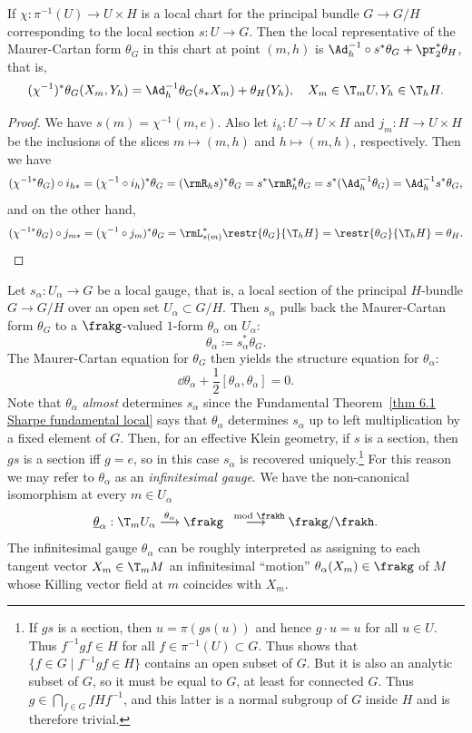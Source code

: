 \begin{prop}\label{prop 4.7.1 Sharpe}
    If $\chi:\pi^{-1}(U)\to U\times H$ is a local chart for the principal bundle $G\to G\slash H$ corresponding to the local section $ s:U\to G$. Then the local representative of the Maurer-Cartan form $\theta_G$ in this chart at point $(m,h)$ is $\Ad_h^{-1}\circ  s^\ast\theta_G +\pr_2^\ast\theta_H$, that is,
    \[(\chi^{-1})^\ast\theta_G(X_m,Y_h)=\Ad_h^{-1}\theta_G( s_\ast X_m)+\theta_H(Y_h),\quad X_m\in \T_mU,Y_h\in \T_h H.\]
\end{prop}
\begin{proof}
    We have $ s(m)=\chi^{-1}(m,e)$. Also let $i_h:U\to U\times H$ and $j_m:H\to U\times H$ be the inclusions of the slices $m\mapsto (m,h)$ and $h\mapsto (m,h)$, respectively. Then we have
    \[(\chi^{-1\ast}\theta_G)\circ i_{h\ast}=(\chi^{-1}\circ i_h)^\ast \theta_G=(\rmR_h s)^\ast \theta_G= s^\ast \rmR_h^\ast \theta_G= s^\ast(\Ad_h^{-1}\theta_G)=\Ad_h^{-1} s^\ast \theta_G,\]
    and on the other hand, 
    \[(\chi^{-1\ast}\theta_G)\circ j_{m\ast}=(\chi^{-1}\circ j_m)^\ast \theta_G=\rmL_{ s(m)}^\ast\restr{\theta_G}{\T_hH}=\restr{\theta_G}{\T_hH}=\theta_H.\]
\end{proof}

Let $ s_\alpha:U_\alpha\to G$ be a local gauge, that is, a local section of the principal $H$-bundle $G\to G\slash H$ over an open set $U_\alpha\subset G\slash H$. Then $ s_\alpha$ pulls back the Maurer-Cartan form $\theta_G$ to a $\frakg$-valued $1$-form $\theta_\alpha$ on $U_\alpha$: \[\theta_\alpha\coloneqq  s_\alpha^\ast\theta_G.\] 
The Maurer-Cartan equation for $\theta_G$ then yields the structure equation for $\theta_\alpha$:
\[\dd\theta_\alpha+\frac 12[\theta_\alpha,\theta_\alpha]=0.\]
Note that $\theta_\alpha$ \emph{almost} determines $ s_\alpha$ since the Fundamental Theorem~\ref{thm 6.1 Sharpe fundamental local} says that $\theta_\alpha$ determines $ s_\alpha$ up to left multiplication by a fixed element of $G$. Then, for an effective Klein geometry, if $ s$ is a section, then $g s$ is a section iff $g=e$, so in this case $ s_\alpha$ is recovered uniquely.\footnote{If $g s$ is a section, then $u=\pi(g s(u))$ and hence $g\cdot u=u$ for all $u\in U$. Thus $f^{-1}gf\in H$ for all $f\in\pi^{-1}(U)\subset G$. Thus shows that $\{f\in G\mid f^{-1}gf\in H\}$ contains an open subset of $G$. But it is also an analytic subset of $G$, so it must be equal to $G$, at least for connected $G$. Thus $g\in \bigcap_{f\in G}fHf^{-1}$, and this latter is a normal subgroup of $G$ inside $H$ and is therefore trivial.} 
For this reason we may refer to $\theta_\alpha$ as an \emph{infinitesimal gauge}. We have the non-canonical isomorphism at every $m\in U_\alpha$
\[\underline{\theta}_\alpha:\T_mU_\alpha\overset{\theta_\alpha}{\longrightarrow}\frakg\overset{\mod\frakh}{\longrightarrow} \frakg\slash\frakh.\]
The infinitesimal gauge $\theta_\alpha$ can be roughly interpreted as assigning to each tangent vector $X_m\in \T_mM$ an infinitesimal ``motion'' $\theta_\alpha(X_m)\in \frakg$ of $M$ whose Killing vector field at $m$ coincides with $X_m$.

